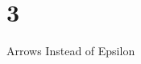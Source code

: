 \documentclass[12pt]{letter}
\begin{document}
\chapter{3}{Arrows Instead of Epsilon}
\end{document}
